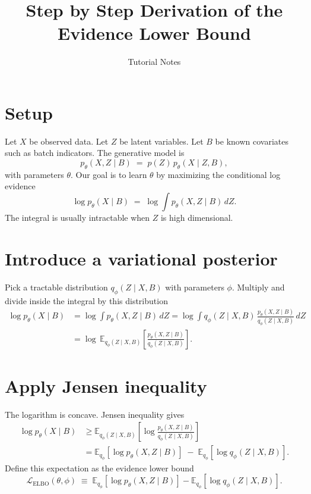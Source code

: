 \documentclass[11pt,a4paper]{article}
\title{Step by Step Derivation of the Evidence Lower Bound}
\author{Tutorial Notes}
\date{}
\begin{document}
\maketitle

\section{Setup}
Let \(X\) be observed data. Let \(Z\) be latent variables. Let \(B\) be known covariates such as batch indicators. The generative model is
\[
p_\theta(X,Z \mid B) \;=\; p(Z)\, p_\theta(X \mid Z,B),
\]
with parameters \(\theta\). Our goal is to learn \(\theta\) by maximizing the conditional log evidence
\[
\log p_\theta(X \mid B) \;=\; \log \int p_\theta(X,Z \mid B)\, dZ.
\]
The integral is usually intractable when \(Z\) is high dimensional.

\section{Introduce a variational posterior}
Pick a tractable distribution \(q_\phi(Z \mid X,B)\) with parameters \(\phi\). Multiply and divide inside the integral by this distribution
\begin{align*}
\log p_\theta(X \mid B)
&= \log \int p_\theta(X,Z \mid B)\, dZ
= \log \int q_\phi(Z \mid X,B)\, \frac{p_\theta(X,Z \mid B)}{q_\phi(Z \mid X,B)}\, dZ \\
&= \log\, \mathbb{E}_{q_\phi(Z \mid X,B)}\!\left[ \frac{p_\theta(X,Z \mid B)}{q_\phi(Z \mid X,B)} \right].
\end{align*}

\section{Apply Jensen inequality}
The logarithm is concave. Jensen inequality gives
\begin{align*}
\log p_\theta(X \mid B)
&\ge \mathbb{E}_{q_\phi(Z \mid X,B)}\!\left[ \log \frac{p_\theta(X,Z \mid B)}{q_\phi(Z \mid X,B)} \right] \\
&= \mathbb{E}_{q_\phi}\!\left[ \log p_\theta(X,Z \mid B) \right] \;-\; \mathbb{E}_{q_\phi}\!\left[\log q_\phi(Z \mid X,B)\right].
\end{align*}
Define this expectation as the evidence lower bound
\[
\mathcal{L}_{\text{ELBO}}(\theta,\phi)
\;\equiv\;
\mathbb{E}_{q_\phi}\!\left[ \log p_\theta(X,Z \mid B) \right]
- \mathbb{E}_{q_\phi}\!\left[\log q_\phi(Z \mid X,B)\right].
\]
\end{document}
